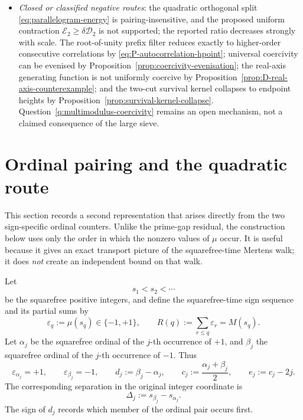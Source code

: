 \documentclass[11pt]{amsart}
\numberwithin{equation}{section}
\theoremstyle{plain}
\theoremstyle{definition}
\theoremstyle{remark}
\begin{document}
\begin{itemize}[leftmargin=1.6em]
limit is Gaussian; that a central limit theorem holds for the antisymmetric
weighted gap sum of Theorem~\ref{thm:gaps}; that the observed numerical
absence of cross-coupling persists asymptotically; or that
$\mathcal D_2/(2\mathcal M_2)\to1$. None follows from the present numerics.
\item \emph{Closed or classified negative routes}: the quadratic orthogonal split
\eqref{eq:parallelogram-energy} is pairing-insensitive, and the proposed
uniform contraction $\mathcal E_2\ge\delta\mathcal D_2$ is not supported; the
reported ratio decreases strongly with scale.  The root-of-unity prefix filter
reduces exactly to higher-order consecutive correlations by
\eqref{eq:P-autocorrelation-hpoint}; universal coercivity can be evenised by
Proposition~\ref{prop:coercivity-evenisation}; the real-axis generating
function is not uniformly coercive by Proposition~\ref{prop:D-real-axis-counterexample};
and the two-cut survival kernel collapses to endpoint heights by
Proposition~\ref{prop:survival-kernel-collapse}.  Question~\ref{q:multimodulus-coercivity}
remains an open mechanism, not a claimed consequence of the large sieve.
\end{itemize}


\section{Ordinal pairing and the quadratic route}
\label{sec:ordinal-pairing}

This section records a second representation that arises directly from the two
sign-specific ordinal counters.  Unlike the prime-gap residual, the construction
below uses only the order in which the nonzero values of $\mu$ occur.  It is useful
because it gives an exact transport picture of the squarefree-time Mertens walk;
it does \emph{not} create an independent bound on that walk.

Let
\begin{equation}
\label{eq:squarefree-order}
s_1<s_2<\cdots
\end{equation}
be the squarefree positive integers, and define the squarefree-time sign sequence
and its partial sums by
\begin{equation}
\label{eq:squarefree-walk}
\varepsilon_q:=\mu(s_q)\in\{-1,+1\},
\qquad
R(q):=\sum_{r\le q}\varepsilon_r=M(s_q).
\end{equation}
Let $\alpha_j$ be the squarefree ordinal of the $j$-th occurrence of $+1$, and
$\beta_j$ the squarefree ordinal of the $j$-th occurrence of $-1$.  Thus
\begin{equation}
\label{eq:pairing-definitions}
\varepsilon_{\alpha_j}=+1,
\qquad
\varepsilon_{\beta_j}=-1,
\qquad
d_j:=\beta_j-\alpha_j,
\qquad
c_j:=\frac{\alpha_j+\beta_j}{2},
\qquad
e_j:=c_j-2j.
\end{equation}
The corresponding separation in the original integer coordinate is
\begin{equation}
\label{eq:integer-pairing-displacement}
\Delta_j:=s_{\beta_j}-s_{\alpha_j}.
\end{equation}
The sign of $d_j$ records which member of the ordinal pair occurs first.
\end{document}
